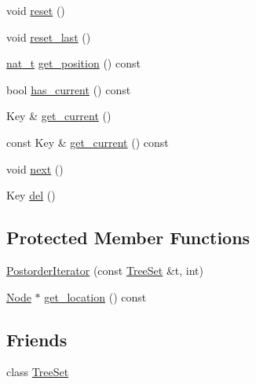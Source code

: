 \begin{DoxyCompactItemize}
void \hyperlink{class_designar_1_1_tree_set_1_1_postorder_iterator_a776630cf833ad659523ef4ca99c06553}{reset} ()
\item 
void \hyperlink{class_designar_1_1_tree_set_1_1_postorder_iterator_a857b3dcc1e25a235f72d0208cdd362a4}{reset\+\_\+last} ()
\item 
\hyperlink{namespace_designar_aa72662848b9f4815e7bf31a7cf3e33d1}{nat\+\_\+t} \hyperlink{class_designar_1_1_tree_set_1_1_postorder_iterator_a09170166eaa3f2dfa50975ea14d99270}{get\+\_\+position} () const
\item 
bool \hyperlink{class_designar_1_1_tree_set_1_1_postorder_iterator_a550cba5f162afa8ff251d750b6147f3c}{has\+\_\+current} () const
\item 
Key \& \hyperlink{class_designar_1_1_tree_set_1_1_postorder_iterator_aac01442bfcab349c1f427f480ff35c38}{get\+\_\+current} ()
\item 
const Key \& \hyperlink{class_designar_1_1_tree_set_1_1_postorder_iterator_aa2d9802b08ed7377213619ae8fa90bc5}{get\+\_\+current} () const
\item 
void \hyperlink{class_designar_1_1_tree_set_1_1_postorder_iterator_a5dc00bc0f67733886839372bce6870e5}{next} ()
\item 
Key \hyperlink{class_designar_1_1_tree_set_1_1_postorder_iterator_aec3466cdaf68ffa2026de3bf5033fefc}{del} ()
\end{DoxyCompactItemize}
\subsection*{Protected Member Functions}
\begin{DoxyCompactItemize}
\item 
\hyperlink{class_designar_1_1_tree_set_1_1_postorder_iterator_ab562263cb488221eb2cfc53b9785a0e6}{Postorder\+Iterator} (const \hyperlink{class_designar_1_1_tree_set}{Tree\+Set} \&t, int)
\item 
\hyperlink{class_designar_1_1_tree_set_a7409a9c1545c0e9e2fd6b84120713c99}{Node} $\ast$ \hyperlink{class_designar_1_1_tree_set_1_1_postorder_iterator_abd9ef4eeb3e56c101dbf32b15253b56e}{get\+\_\+location} () const
\end{DoxyCompactItemize}
\subsection*{Friends}
\begin{DoxyCompactItemize}
\item 
class \hyperlink{class_designar_1_1_tree_set_1_1_postorder_iterator_a7caa42294700d2a60905ec3458a7cd8a}{Tree\+Set}
\end{DoxyCompactItemize}


